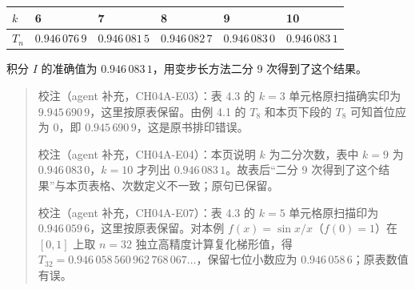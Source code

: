 \documentclass[
  10pt,
  fontset=fandol]{ctexart}
\newcounter{none} %
\begin{document}
{\def\LTcaptype{none} %
\begin{longtable}[]{@{}
  >{\raggedright\arraybackslash}p{}
  >{\raggedright\arraybackslash}p{}
  >{\raggedright\arraybackslash}p{}
  >{\raggedright\arraybackslash}p{}
  >{\raggedright\arraybackslash}p{}
  >{\raggedright\arraybackslash}p{}@{}}
\toprule\noalign{}
\begin{minipage}[b]{\linewidth}\raggedright
\(k\)
\end{minipage} & \begin{minipage}[b]{\linewidth}\raggedright
6
\end{minipage} & \begin{minipage}[b]{\linewidth}\raggedright
7
\end{minipage} & \begin{minipage}[b]{\linewidth}\raggedright
8
\end{minipage} & \begin{minipage}[b]{\linewidth}\raggedright
9
\end{minipage} & \begin{minipage}[b]{\linewidth}\raggedright
10
\end{minipage} \\
\midrule\noalign{}
\endhead
\bottomrule\noalign{}
\endlastfoot
\(T_n\) & \(0.946\,076\,9\) & \(0.946\,081\,5\) & \(0.946\,082\,7\) & \(0.946\,083\,0\) & \(0.946\,083\,1\) \\
\end{longtable}
}

积分 \(I\) 的准确值为 \(0.946\,083\,1\)，用变步长方法二分 9 次得到了这个结果。

\begin{quote}
校注（agent 补充，CH04A-E03）：表 4.3 的 \(k=3\) 单元格原扫描确实印为 \(9.945\,690\,9\)，这里按原表保留。由例 4.1 的 \(T_8\) 和本页下段的 \(T_8\) 可知首位应为 \(0\)，即 \(0.945\,690\,9\)，这是原书排印错误。

校注（agent 补充，CH04A-E04）：本页说明 \(k\) 为二分次数，表中 \(k=9\) 为 \(0.946\,083\,0\)，\(k=10\) 才列出 \(0.946\,083\,1\)。故表后``二分 9 次得到了这个结果''与本页表格、次数定义不一致；原句已保留。

校注（agent 补充，CH04A-E07）：表 4.3 的 \(k=5\) 单元格原扫描印为 \(0.946\,059\,6\)，这里按原表保留。对本例 \(f(x)=\sin x/x\)（\(f(0)=1\)）在 \([0,1]\) 上取 \(n=32\) 独立高精度计算复化梯形值，得 \(T_{32}=0.946\,058\,560\,962\,768\,067\ldots\)，保留七位小数应为 \(0.946\,058\,6\)；原表数值有误。
\end{quote}
\end{document}
